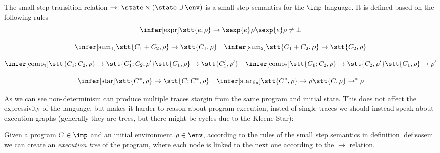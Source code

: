 \begin{definition}\label{def:sosem}
  The small step transition relation \(\to : \state \times (\state
  \cup \env)\) is a small step semantics for the
  \(\imp\) language. It is defined based on the following rules
  \[\infer[\text{expr}]
          {\stt{e, \rho} \to \sexp{e}\rho}
          {\sexp{e}\rho \neq \bot}\]
          
          \[\infer[\text{sum}_1]
                  {\stt{C_1 + C_2, \rho} \to \stt{C_1, \rho}}
                  {} \quad
                  \infer[\text{sum}_2]
                        {\stt{C_1 + C_2, \rho} \to \stt{C_2, \rho}}
                        {}\]
                        
                        \[\infer[\text{comp}_1]
                                {\stt{C_1; C_2, \rho} \to \stt{C_1'; C_2, \rho'}}
                                {\stt{C_1, \rho} \to \stt{C_1', \rho'}} \quad
                                \infer[\text{comp}_2]
                                      {\stt{C_1; C_2, \rho} \to \stt{C_2, \rho'}}
                                      {\stt{C_1, \rho} \to \rho'}\]

                                      \[\infer[\text{star}]
                                              {\stt{C^*, \rho} \to \stt{C;C^*, \rho}}
                                              {} \quad
                                              \infer[\text{star}_{\text{fix}}]
                                                    {\stt{C^*, \rho} \to \rho}
                                                    {\stt{C, \rho} \to^* \rho}\]
\end{definition}

As we can see non-determinism can produce multiple traces stargin from
the same program and initial state. This does not affect the
expressivity of the language, but makes it harder to reason about
program execution, insted of single traces we should instead speak
about execution graphs (generally they are trees, but there might be
cycles due to the Kleene Star):

\begin{definition}
  Given a program \(C\in\imp\) and an initial environment \(\rho \in
  \env\), according to the rules of the small step semantics in
  definition \ref{def:sosem} we can create an \emph{execution tree} of
  the program, where each node is linked to the next one according to
  the \(\to\) relation.
\end{definition}

